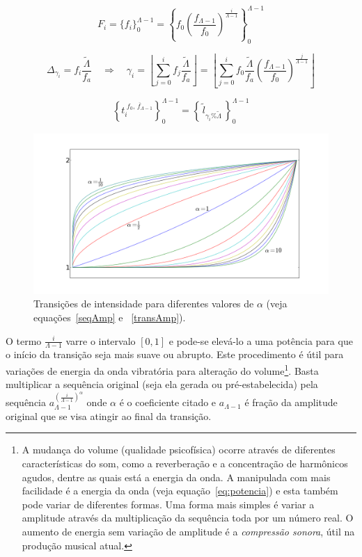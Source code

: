 \begin{equation}\label{freqExponencial}
F_i=\{f_i\}_0^{\Lambda-1}=\left\{f_0 \left ( \frac{f_{\Lambda-1}}{f_0} \right ) ^{\frac{i}{\Lambda -1}} \right\}_0^{\Lambda-1}
\end{equation}

\begin{equation}\label{indiceExponencial}
\Delta_{\gamma_i}=f_i\frac{\widetilde{\Lambda}}{f_a} \quad \Rightarrow \quad \gamma_i=\left \lfloor \sum_{j=0}^{i} f_j\frac{\widetilde{\Lambda}}{f_a} \right \rfloor   =\left \lfloor \sum_{j=0}^{i} f_0 \frac{\widetilde{\Lambda}}{f_a} \left ( \frac{f_{\Lambda-1}}{f_0} \right ) ^{\frac{j}{\Lambda -1}} \right \rfloor
\end{equation}

\begin{equation}\label{serieAmostralLog}
\left\{t_i^{\;\overline{f_0,\,f_{\Lambda-1}}}\right\}_0^{\Lambda-1}=\left\{\,\widetilde{l}_{\gamma_i \% \widetilde{\Lambda}}\,\right\}_0^{\Lambda-1}
\end{equation}

\begin{figure}[h!]
    \centering
        \includegraphics[width=\textwidth]{figuras/transicao}
    \caption{Transições de intensidade para diferentes valores de $\alpha$ (veja equações~\ref{seqAmp} e ~\ref{transAmp}).}
        \label{fig:transicao}
\end{figure}


O termo $\frac{i}{\Lambda-1}$ varre o intervalo $[0,1]$ e pode-se elevá-lo a uma potência
para que o início da transição seja mais suave ou abrupto.
Este procedimento é útil para variações de energia
da onda vibratória para alteração do volume\footnote{A mudança do volume (qualidade psicofísica) ocorre através de diferentes características 
do som, como a reverberação e a concentração de harmônicos agudos, dentre as quais está a energia da onda.
A manipulada com mais facilidade é a energia da onda (veja equação~\ref{eq:potencia}) e esta também pode variar de diferentes formas.
Uma forma mais simples é variar a amplitude através da multiplicação da sequência toda
por um número real. O aumento de energia sem variação de
amplitude é a \emph{compressão sonora}, útil na
produção musical atual.\cite{guillaume}}. Basta multiplicar a sequência original
(seja ela gerada ou pré-estabelecida) pela sequência $a_{\Lambda-1}^{\left( \frac{i}{\Lambda-1} \right )^\alpha}$
onde $\alpha$ é o coeficiente citado e $a_{\Lambda-1}$ é fração da amplitude original que se visa atingir ao final da transição.

